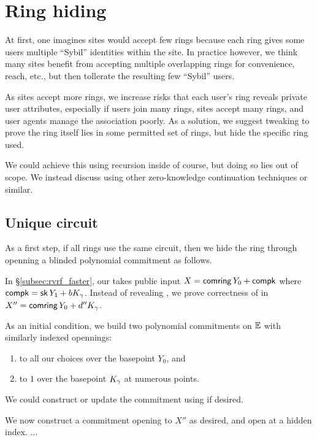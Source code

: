 \section{Ring hiding}%
\label{sec:ring_hiding}

At first, one imagines sites would accept few rings because each ring
gives some users multiple ``Sybil'' identities within the site.
In practice however, we think many sites benefit from accepting
multiple overlapping rings for convenience, reach, etc., but then
tollerate the resulting few ``Sybil'' users.

As sites accept more rings, we increase risks that each user's ring
\ctx reveals private user attributes, especially if
 users join many rings, sites accept many rings, and
 user agents manage the association poorly.
As a solution, we suggest tweaking \pifast to prove the ring itself
lies in some permitted set of rings, but hide the specific ring used.

We could achieve this using recursion inside \pifast of course,
but doing so lies out of scope.  We instead discuss using other
zero-knowledge continuation techniques or similar.

\subsection{Unique circuit}

As a first step, if all rings use the same circuit, then we hide the
ring through openning a blinded polynomial commitment \cite{KZG} as follows. 

In \S\ref{subsec:rvrf_faster}, our \pifast takes public input
 $X = \mathsf{comring}\, Y_0 + \mathsf{compk}$ where $\mathsf{compk} = \mathsf{sk}\, Y_1 + b K_\gamma$.
Instead of revealing \comring, we prove correctness of \comring in
 $X'' = \mathsf{comring}\, Y_0 + d'' K_\gamma$.

As an initial condition, we build two polynomial commitments \cite{KZG}
on ${\mathbb{E}}$ with similarly indexed opennings:
\begin{enumerate}
\item to all our \comring choices over the basepoint $Y_0$, and
\item to $1$ over the basepoint $K_\gamma$ at numerous points.
\end{enumerate}
We could construct or update the \comring commitment using \cite{aSVC} if desired.

We now construct a commitment opening to $X''$ as desired, and
open at a hidden index. ...

